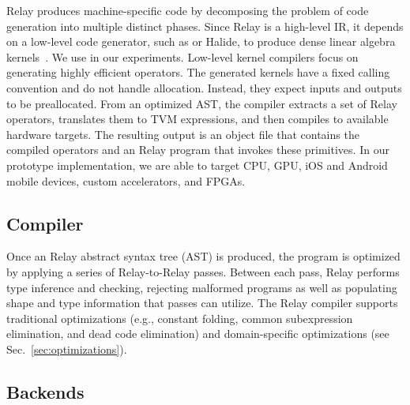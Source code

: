     Relay produces machine-specific code
      by decomposing the problem of code generation into multiple distinct phases.
    Since Relay is a high-level IR, it depends on a low-level code generator,
      such as \tvm or Halide,
      to produce dense linear algebra kernels~\citep{tvm_osdi18, halide}.
    We use \tvm in our experiments.
    Low-level kernel compilers focus on generating highly efficient operators.
    The generated kernels have a fixed calling convention and do not
      handle allocation. Instead, they expect inputs and outputs to be preallocated.
    From an optimized AST,
      the compiler extracts a set of Relay operators,
      translates them to TVM expressions,
      and then compiles to available hardware targets.
    The resulting output is an
      object file that contains the compiled operators
      and an Relay program that invokes these primitives.
    In our prototype implementation,
      we are able to target CPU, GPU,
      iOS and Android mobile devices,
      custom accelerators, and FPGAs.

\subsection{Compiler}
Once an Relay abstract syntax tree (AST) is produced,
    the program is optimized by applying a series of Relay-to-Relay
    passes.
Between each pass, Relay performs type inference and checking,
    rejecting malformed programs as well as populating shape and type
    information that passes can utilize.
The Relay compiler supports traditional optimizations
    (e.g., constant folding, common subexpression elimination, and dead code elimination)
    and domain-specific optimizations
    (see Sec.~\ref{sec:optimizations}).

\subsection{Backends}

